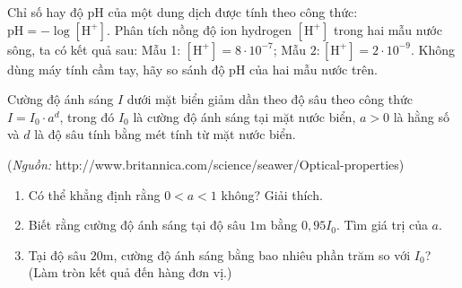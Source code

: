 \begin{bt}
	Chỉ số hay độ pH của một dung dịch được tính theo công thức: $\mathrm{pH}=-\log \left[\mathrm{H}^{+}\right]$. Phân tích nồng độ ion hydrogen $\left[\mathrm{H}^{+}\right]$ trong hai mẫu nước sông, ta có kết quả sau: Mẫu 1: $\left[\mathrm{H}^{+}\right]=8 \cdot 10^{-7}$; Mẫu $2:\left[\mathrm{H}^{+}\right]=2 \cdot 10^{-9}$.
	Không dùng máy tính cầm tay, hãy so sánh độ pH của hai mẫu nước trên.
\end{bt}
\begin{bt}%
	Cường độ ánh sáng $I$ dưới mặt biển giảm dần theo độ sâu theo công thức $I=I_0\cdot a^d$, trong đó $I_0$ là cường độ ánh sáng tại mặt nước biển, $a>0$ là hằng số và $d$ là độ sâu tính bằng mét tính từ mặt nước biển.
	\begin{center}
		(\textit{Nguồn:}  http://www.britannica.com/science/seawer/Optical-properties)
	\end{center}
	\begin{enumerate}
		\item Có thể khẳng định rằng $0<a<1$ không? Giải thích.
		\item Biết rằng cường độ ánh sáng tại độ sâu $1$m bằng $0{,}95I_0$. Tìm giá trị của $a$.
		\item Tại độ sâu $20$m, cường độ ánh sáng bằng bao nhiêu phần trăm so với $I_0$? (Làm tròn kết quả đến hàng đơn vị.)
	\end{enumerate}
\end{bt}
